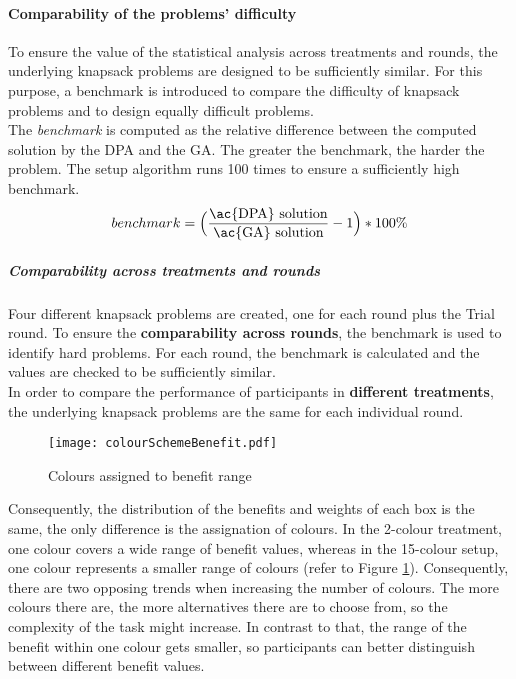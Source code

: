 \paragraph{Comparability of the problems' difficulty}
To ensure the value of the statistical analysis across treatments and rounds, the underlying knapsack problems are designed to be sufficiently similar. For this purpose, a benchmark is introduced to compare the difficulty of knapsack problems and to design equally difficult problems.\\
The \textit{benchmark} is computed as the relative difference between the computed solution by the \ac{DPA} and the \ac{GA}. The greater the benchmark, the harder the problem.
The setup algorithm runs 100 times to ensure a sufficiently high benchmark.
\begin{equation}
benchmark = \Big(\dfrac{\text{\ac{DPA} solution}}{\text{\ac{GA} solution}} -1\Big) * 100\%
\end{equation}

\subparagraph{Comparability across treatments and rounds}
Four different knapsack problems are created, one for each round plus the Trial round. To ensure the \textbf{comparability across rounds}, the benchmark is used to identify hard problems. For each round, the benchmark is calculated and the values are checked to be sufficiently similar.\\ 
In order to compare the performance of participants in \textbf{different treatments}, the underlying knapsack problems are the same for each individual round.
 \begin{figure}[htp] %
\begin{center}
  \texttt{[image: colourSchemeBenefit.pdf]}
\caption{Colours assigned to benefit range}
\label{fig:colourSchemeBenefit}
\end{center}
\end{figure}
Consequently, the distribution of the benefits and weights of each box is the same, the only difference is the assignation of colours. In the 2-colour treatment, one colour covers a wide range of benefit values, whereas in the 15-colour setup, one colour represents a smaller range of colours (refer to Figure \ref{fig:colourSchemeBenefit}).  Consequently, there are two opposing trends when increasing the number of colours. The more colours there are, the more alternatives there are to choose from, so the complexity of the task might increase. In contrast to that, the range of the benefit within one colour gets smaller, so participants can better distinguish between different benefit values.

